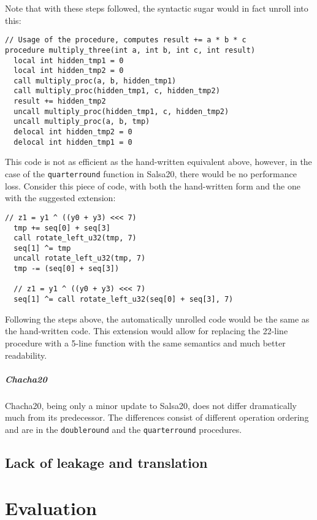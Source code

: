 \documentclass[a4paper,10pt,openright]{memoir}
\newcommand{\code}[1]{\texttt{#1}}
\begin{document}
Note that with these steps followed, the syntactic sugar would in fact 
unroll into this:

\begin{lstlisting}[language=Janus]
// Usage of the procedure, computes result += a * b * c
procedure multiply_three(int a, int b, int c, int result)
  local int hidden_tmp1 = 0
  local int hidden_tmp2 = 0
  call multiply_proc(a, b, hidden_tmp1)
  call multiply_proc(hidden_tmp1, c, hidden_tmp2)
  result += hidden_tmp2
  uncall multiply_proc(hidden_tmp1, c, hidden_tmp2)
  uncall multiply_proc(a, b, tmp)
  delocal int hidden_tmp2 = 0
  delocal int hidden_tmp1 = 0
\end{lstlisting}

This code is not as efficient as the hand-written equivalent above, 
however, in the case of the \code{quarterround} function in Salsa20, 
there would be no performance loss. Consider this piece of code, 
with both the hand-written form and the one with the suggested 
extension:

\begin{lstlisting}[language=Janus]
  // z1 = y1 ^ ((y0 + y3) <<< 7)
  tmp += seq[0] + seq[3]
  call rotate_left_u32(tmp, 7)
  seq[1] ^= tmp
  uncall rotate_left_u32(tmp, 7)
  tmp -= (seq[0] + seq[3])
  
  // z1 = y1 ^ ((y0 + y3) <<< 7)
  seq[1] ^= call rotate_left_u32(seq[0] + seq[3], 7)
\end{lstlisting}

Following the steps above, the automatically unrolled code would be the 
same as the hand-written code. This extension would allow for replacing 
the 22-line procedure with a 5-line function with the same semantics 
and much better readability.


\paragraph{Chacha20}

Chacha20, being only a minor update to Salsa20, does not differ 
dramatically much from its predecessor. The differences consist of 
different operation ordering and are in the \code{doubleround} and the 
\code{quarterround} procedures. 

\section{Lack of leakage and translation}



\chapter{Evaluation}
\label{sec:eval}
\end{document}
